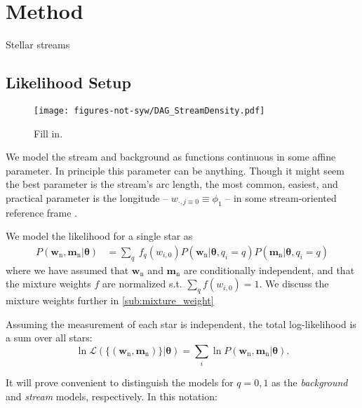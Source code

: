 \documentclass[twocolumn]{aastex631}
\newcommand{\mrm}[1]{\mathrm{#1}}
\newcommand{\mbs}[1]{\boldsymbol{#1}}
\newcommand{\mcal}[1]{\mathcal{#1}}
\newcommand{\nth}[1]{{#1}_{\mrm{n}}}
\newcommand{\pdf}{P}
\begin{document}

\section{Method} \label{sec:method}


    Stellar streams 

    \subsection{Likelihood Setup}\label{sub:likelihood_setup}
    
        \begin{figure}
        \centering
        \texttt{[image: figures-not-syw/DAG\_StreamDensity.pdf]}
        \caption{Fill in.}
        \label{fig: DAG}
        \end{figure} 
    
        We model the stream and background as functions continuous in some affine parameter. In principle this parameter can be anything. Though it might seem the best parameter is the stream's arc length, the most common, easiest, and practical parameter is the longitude -- $w_{\cdot, j\equiv0} \equiv \phi_1$ -- in some stream-oriented reference frame \citep[for details see][section 2]{2023MNRAS.522.5022S}.


        

        We model the likelihood for a single star as
        \begin{align} \label{eq:general_model}
            \pdf(\nth{\mbs{w}}, \nth{\mbs{m}} | \mbs{\theta})
                &= \sum_{q} \ f_q(w_{i, 0}) \pdf(\nth{\mbs{w}}|\mbs{\theta},q_i\!=\!q) \pdf(\nth{\mbs{m}}|\mbs{\theta},q_i\!=\!q)
        \end{align}
        where we have assumed that $\nth{\mbs{w}}$ and $\nth{\mbs{m}}$ are conditionally independent, and that the mixture weights $f$ are normalized s.t. $\sum_q f(w_{i,0}) = 1$. We discuss the mixture weights further in \autoref{sub:mixture_weight}

        Assuming the measurement of each star is independent, the total log-likelihood is a sum over all stars:
        \begin{equation}
            \ln\mcal{L}\left(\{(\nth{\mbs{w}},\nth{\mbs{m}})\} | \mbs{\theta}\right) = \sum_i  \ln \pdf(\nth{\mbs{w}}, \nth{\mbs{m}} | \mbs{\theta}).
        \end{equation}

        It will prove convenient to distinguish the models for $q=0,1$ as the \textit{background} and \textit{stream} models, respectively. In this notation:
\end{document}
